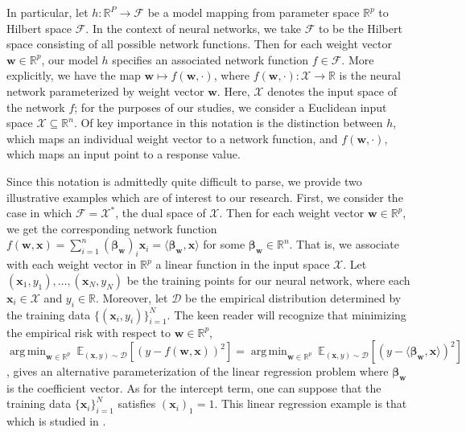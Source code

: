 \documentclass{article}
\DeclareMathOperator*{\argmin}{arg\,min}
\begin{document}
In particular, let $h: \mathbb{R}^P \rightarrow \mathcal{F}$ be a model mapping from parameter space $\mathbb{R}^p$ to Hilbert space $\mathcal{F}$. In the context of neural networks, we take $\mathcal{F}$ to be the Hilbert space consisting of all possible network functions. Then for each weight vector $\boldsymbol{w} \in \mathbb{R}^p$, our model $h$ specifies an associated network function $f \in \mathcal{F}$. More explicitly, we have the map $\boldsymbol{w} \mapsto f(\boldsymbol{w}, \cdot)$, where $f(\boldsymbol{w}, \cdot): \mathcal{X} \rightarrow \mathbb{R}$ is the neural network parameterized by weight vector $\boldsymbol{w}$. Here, $\mathcal{X}$ denotes the input space of the network $f$; for the purposes of our studies, we consider a Euclidean input space $\mathcal{X} \subseteq \mathbb{R}^n$. Of key importance in this notation is the distinction between $h$, which maps an individual weight vector to a network function, and $f(\boldsymbol{w}, \cdot)$, which maps an input point to a response value.

Since this notation is admittedly quite difficult to parse, we provide two illustrative examples which are of interest to our research. First, we consider the case in which $\mathcal{F} = \mathcal{X}^*$, the dual space of $\mathcal{X}$. Then for each weight vector $\boldsymbol{w} \in \mathbb{R}^p$, we get the corresponding network function $f(\boldsymbol{w}, \boldsymbol{x}) = \sum_{i=1}^n (\boldsymbol{\beta}_{\boldsymbol{w}})_i\boldsymbol{x}_i = \langle \boldsymbol{\beta}_{\boldsymbol{w}}, \boldsymbol{x} \rangle$ for some $\boldsymbol{\beta}_{\boldsymbol{w}} \in \mathbb{R}^n$. That is, we associate with each weight vector in $\mathbb{R}^p$ a linear function in the input space $\mathcal{X}$. Let $(\boldsymbol{x}_1, y_1), \ldots, (\boldsymbol{x}_N, y_N)$ be the training points for our neural network, where each $\boldsymbol{x}_i \in \mathcal{X}$ and $y_i \in \mathbb{R}$. Moreover, let $\mathcal{D}$ be the empirical distribution determined by the training data $\{(\boldsymbol{x}_i, y_i) \}_{i=1}^N$. The keen reader will recognize that minimizing the empirical risk with respect to $\boldsymbol{w} \in \mathbb{R}^p$, $\argmin_{\boldsymbol{w} \in \mathbb{R}^p} \  \mathbb{E}_{(\boldsymbol{x}, y) \sim \mathcal{D}}\left[\left(y - f(\boldsymbol{w}, \boldsymbol{x}) \right)^2 \right] = \argmin_{\boldsymbol{w} \in \mathbb{R}^p} \  \mathbb{E}_{(\boldsymbol{x}, y) \sim \mathcal{D}}\left[\left(y - \langle \boldsymbol{\beta}_{\boldsymbol{w}}, \boldsymbol{x} \rangle \right)^2 \right]$, gives an alternative parameterization of the linear regression problem where $\boldsymbol{\beta}_{\boldsymbol{w}}$ is the coefficient vector. As for the intercept term, one can suppose that the training data $\{ \boldsymbol{x}_i \}_{i=1}^N$ satisfies $(\boldsymbol{x}_i)_1 = 1$. This linear regression example is that which is studied in \cite{woodworth2020kernel}. 
\end{document}
